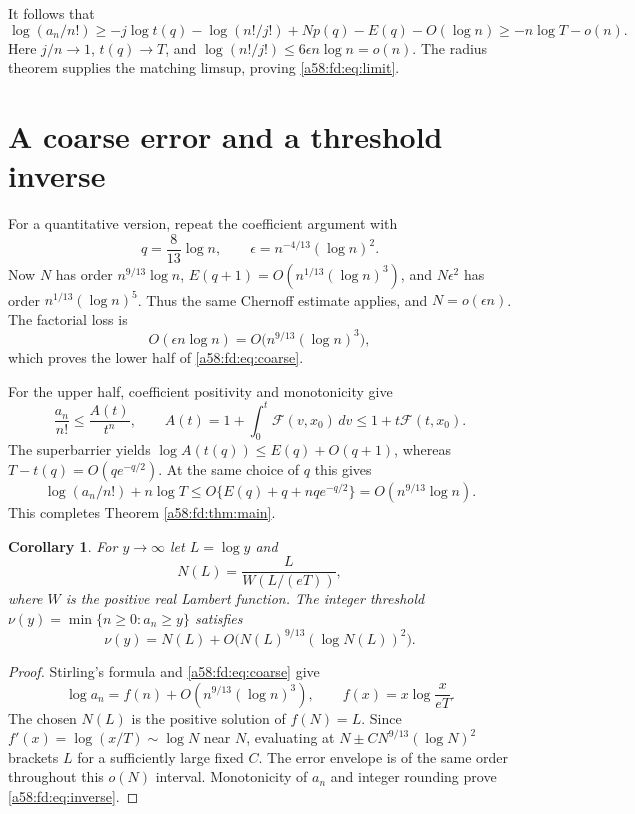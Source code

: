 \documentclass[11pt,letterpaper]{article}
\newtheorem{corollary}[theorem]{Corollary}
\theoremstyle{remark}
\begin{document}
It follows that
\[
 \log(a_n/n!)\ge-j\log t(q)-\log(n!/j!)+Np(q)-E(q)-O(\log n)
             \ge-n\log T-o(n).
\]
Here $j/n\to1$, $t(q)\to T$, and
$\log(n!/j!)\le6\epsilon n\log n=o(n)$. The radius theorem supplies the matching limsup, proving \eqref{a58:fd:eq:limit}.

\section{A coarse error and a threshold inverse}\label{a58:fd:sec:coarse}
For a quantitative version, repeat the coefficient argument with
\[
 q=\frac8{13}\log n,\qquad
 \epsilon=n^{-4/13}(\log n)^2.
\]
Now $N$ has order $n^{9/13}\log n$, $E(q+1)=O(n^{1/13}(\log n)^3)$, and $N\epsilon^2$ has order $n^{1/13}(\log n)^5$. Thus the same Chernoff estimate applies, and $N=o(\epsilon n)$. The factorial loss is
\[
 O(\epsilon n\log n)=O\bigl(n^{9/13}(\log n)^3\bigr),
\]
which proves the lower half of \eqref{a58:fd:eq:coarse}.

For the upper half, coefficient positivity and monotonicity give
\[
 \frac{a_n}{n!}\le\frac{A(t)}{t^n},\qquad
 A(t)=1+\int_0^t\mathcal F(v,x_0)\,dv\le1+t\mathcal F(t,x_0).
\]
The superbarrier yields $\log A(t(q))\le E(q)+O(q+1)$, whereas
$T-t(q)=O(qe^{-q/2})$. At the same choice of $q$ this gives
\[
 \log(a_n/n!)+n\log T
 \le O\{E(q)+q+nq e^{-q/2}\}
 =O(n^{9/13}\log n).
\]
This completes Theorem \ref{a58:fd:thm:main}.

\begin{corollary}\label{a58:fd:cor:inverse}
For $y\to\infty$ let $L=\log y$ and
\[
 N(L)=\frac{L}{W(L/(eT))},
\]
where $W$ is the positive real Lambert function. The integer threshold
$\nu(y)=\min\{n\ge0:a_n\ge y\}$ satisfies
\begin{equation}\label{a58:fd:eq:inverse}
 \nu(y)=N(L)+O\bigl(N(L)^{9/13}(\log N(L))^2\bigr).
\end{equation}
\end{corollary}
\begin{proof}
Stirling's formula and \eqref{a58:fd:eq:coarse} give
\[
 \log a_n=f(n)+O(n^{9/13}(\log n)^3),\qquad
 f(x)=x\log\frac{x}{eT}.
\]
The chosen $N(L)$ is the positive solution of $f(N)=L$. Since
$f'(x)=\log(x/T)\sim\log N$ near $N$, evaluating at
$N\pm C N^{9/13}(\log N)^2$ brackets $L$ for a sufficiently large fixed $C$. The error envelope is of the same order throughout this $o(N)$ interval. Monotonicity of $a_n$ and integer rounding prove \eqref{a58:fd:eq:inverse}.
\end{proof}
\end{document}
